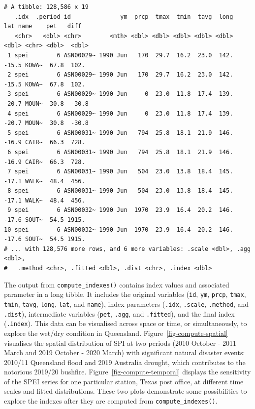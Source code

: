 \documentclass[
]{article}
\begin{document}
\begin{verbatim}
# A tibble: 128,586 x 19
   .idx  .period id              ym  prcp  tmax  tmin  tavg  long   lat name    pet   diff
   <chr>   <dbl> <chr>        <mth> <dbl> <dbl> <dbl> <dbl> <dbl> <dbl> <chr> <dbl>  <dbl>
 1 spei        6 ASN00029~ 1990 Jun   170  29.7  16.2  23.0  142. -15.5 KOWA~  67.8  102. 
 2 spei        6 ASN00029~ 1990 Jun   170  29.7  16.2  23.0  142. -15.5 KOWA~  67.8  102. 
 3 spei        6 ASN00029~ 1990 Jun     0  23.0  11.8  17.4  139. -20.7 MOUN~  30.8  -30.8
 4 spei        6 ASN00029~ 1990 Jun     0  23.0  11.8  17.4  139. -20.7 MOUN~  30.8  -30.8
 5 spei        6 ASN00031~ 1990 Jun   794  25.8  18.1  21.9  146. -16.9 CAIR~  66.3  728. 
 6 spei        6 ASN00031~ 1990 Jun   794  25.8  18.1  21.9  146. -16.9 CAIR~  66.3  728. 
 7 spei        6 ASN00031~ 1990 Jun   504  23.0  13.8  18.4  145. -17.1 WALK~  48.4  456. 
 8 spei        6 ASN00031~ 1990 Jun   504  23.0  13.8  18.4  145. -17.1 WALK~  48.4  456. 
 9 spei        6 ASN00032~ 1990 Jun  1970  23.9  16.4  20.2  146. -17.6 SOUT~  54.5 1915. 
10 spei        6 ASN00032~ 1990 Jun  1970  23.9  16.4  20.2  146. -17.6 SOUT~  54.5 1915. 
# ... with 128,576 more rows, and 6 more variables: .scale <dbl>, .agg <dbl>,
#   .method <chr>, .fitted <dbl>, .dist <chr>, .index <dbl>
\end{verbatim}

The output from \texttt{compute\_indexes()} contains index values and
associated parameter in a long tibble. It includes the original
variables (\texttt{id}, \texttt{ym}, \texttt{prcp}, \texttt{tmax},
\texttt{tmin}, \texttt{tavg}, \texttt{long}, \texttt{lat}, and
\texttt{name}), index parameters (\texttt{.idx}, \texttt{.scale},
\texttt{.method}, and \texttt{.dist}), intermediate variables
(\texttt{pet}, \texttt{.agg}, and \texttt{.fitted}), and the final index
(\texttt{.index}). This data can be visualised across space or time, or
simultaneously, to explore the wet/dry condition in Queensland.
Figure~\ref{fig-compute-spatial} visualises the spatial distribution of
SPI at two periods (2010 October - 2011 March and 2019 October - 2020
March) with significant natural disaster events: 2010/11 Queensland
flood and 2019 Australia drought, which contributes to the notorious
2019/20 bushfire. Figure~\ref{fig-compute-temporal} displays the
sensitivity of the SPEI series for one particular station, Texas post
office, at different time scales and fitted distributions. These two
plots demonstrate some possibilities to explore the indexes after they
are computed from \texttt{compute\_indexes()}.
\end{document}
